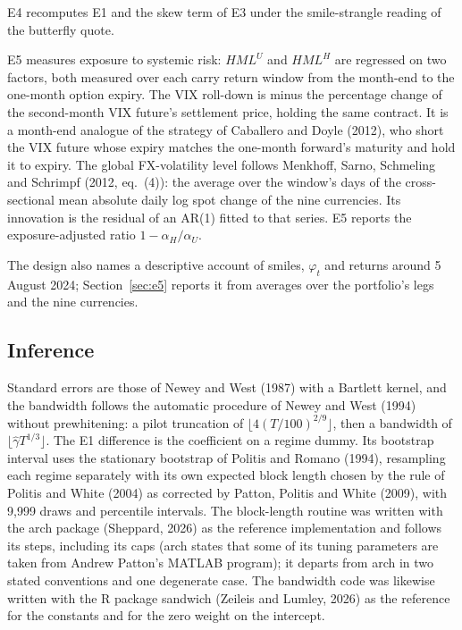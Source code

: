 \documentclass[11pt]{article}
\theoremstyle{result}
\newcommand{\HML}{\mathit{HML}}
\begin{document}
E4 recomputes E1 and the skew term of E3 under the smile-strangle reading of the butterfly quote.

E5 measures exposure to systemic risk: $\HML^U$ and $\HML^H$ are regressed on two factors, both measured over each carry return window from the month-end to the one-month option expiry. The VIX roll-down is minus the percentage change of the second-month VIX future's settlement price, holding the same contract. It is a month-end analogue of the strategy of Caballero and Doyle (2012), who short the VIX future whose expiry matches the one-month forward's maturity and hold it to expiry. The global FX-volatility level follows Menkhoff, Sarno, Schmeling and Schrimpf (2012, eq.~(4)): the average over the window's days of the cross-sectional mean absolute daily log spot change of the nine currencies. Its innovation is the residual of an AR(1) fitted to that series. E5 reports the exposure-adjusted ratio $1-\alpha_H/\alpha_U$.

The design also names a descriptive account of smiles, $\varphi_t$ and returns around 5 August 2024; Section~\ref{sec:e5} reports it from averages over the portfolio's legs and the nine currencies.

\subsection{Inference}

Standard errors are those of Newey and West (1987) with a Bartlett kernel, and the bandwidth follows the automatic procedure of Newey and West (1994) without prewhitening: a pilot truncation of $\lfloor4(T/100)^{2/9}\rfloor$, then a bandwidth of $\lfloor\hat\gamma T^{1/3}\rfloor$. The E1 difference is the coefficient on a regime dummy. Its bootstrap interval uses the stationary bootstrap of Politis and Romano (1994), resampling each regime separately with its own expected block length chosen by the rule of Politis and White (2004) as corrected by Patton, Politis and White (2009), with 9,999 draws and percentile intervals. The block-length routine was written with the arch package (Sheppard, 2026) as the reference implementation and follows its steps, including its caps (arch states that some of its tuning parameters are taken from Andrew Patton's MATLAB program); it departs from arch in two stated conventions and one degenerate case. The bandwidth code was likewise written with the R package sandwich (Zeileis and Lumley, 2026) as the reference for the constants and for the zero weight on the intercept.
\end{document}
